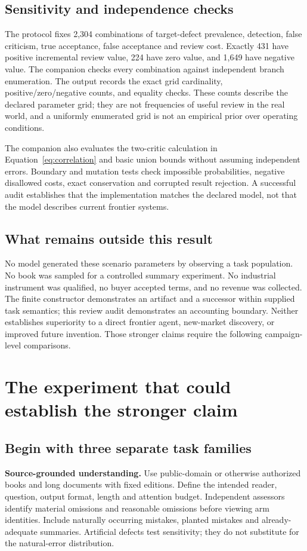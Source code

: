 \subsection{Sensitivity and independence checks}
The protocol fixes 2,304 combinations of target-defect prevalence, detection, false criticism, true acceptance, false acceptance and review cost. Exactly 431 have positive incremental review value, 224 have zero value, and 1,649 have negative value. The companion checks every combination against independent branch enumeration. The output records the exact grid cardinality, positive/zero/negative counts, and equality checks. These counts describe the declared parameter grid; they are not frequencies of useful review in the real world, and a uniformly enumerated grid is not an empirical prior over operating conditions.

The companion also evaluates the two-critic calculation in Equation~\eqref{eq:correlation} and basic union bounds without assuming independent errors. Boundary and mutation tests check impossible probabilities, negative disallowed costs, exact conservation and corrupted result rejection. A successful audit establishes that the implementation matches the declared model, not that the model describes current frontier systems.

\subsection{What remains outside this result}
No model generated these scenario parameters by observing a task population. No book was sampled for a controlled summary experiment. No industrial instrument was qualified, no buyer accepted terms, and no revenue was collected. The finite constructor demonstrates an artifact and a successor within supplied task semantics; this review audit demonstrates an accounting boundary. Neither establishes superiority to a direct frontier agent, new-market discovery, or improved future invention. Those stronger claims require the following campaign-level comparisons.

\section{The experiment that could establish the stronger claim}
\label{sec:empirical}
\subsection{Begin with three separate task families}
\textbf{Source-grounded understanding.} Use public-domain or otherwise authorized books and long documents with fixed editions. Define the intended reader, question, output format, length and attention budget. Independent assessors identify material omissions and reasonable omissions before viewing arm identities. Include naturally occurring mistakes, planted mistakes and already-adequate summaries. Artificial defects test sensitivity; they do not substitute for the natural-error distribution.

